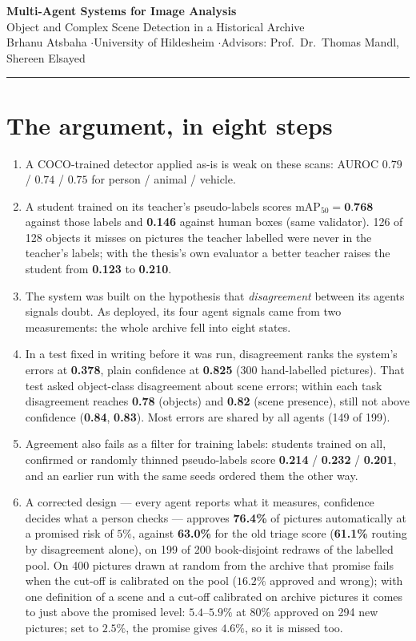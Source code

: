 \documentclass[10pt,a4paper]{article}
\newcommand{\num}[1]{\textbf{#1}}
\begin{document}
\begin{center}
{\Large\bfseries Multi-Agent Systems for Image Analysis}\\[1mm]
{\normalsize Object and Complex Scene Detection in a Historical Archive}\\[2mm]
{\footnotesize\color{PrismGray} Brhanu Atsbaha \quad$\cdot$\quad University of Hildesheim \quad$\cdot$\quad Advisors: Prof.\ Dr.\ Thomas Mandl, Shereen Elsayed}
\end{center}
\vspace{-2mm}
\rule{\textwidth}{0.8pt}

\section{The argument, in eight steps}
\begin{enumerate}[leftmargin=1.4em, itemsep=2pt, topsep=3pt]
  \item A COCO-trained detector applied as-is is weak on these scans: AUROC $0.79$ / $0.74$ / $0.75$ for person / animal / vehicle.
  \item A student trained on its teacher's pseudo-labels scores $\text{mAP}_{50}=\num{0.768}$ against those labels and \num{0.146} against human boxes (same validator). 126 of 128 objects it misses on pictures the teacher labelled were never in the teacher's labels; with the thesis's own evaluator a better teacher raises the student from \num{0.123} to \num{0.210}.
  \item The system was built on the hypothesis that \emph{disagreement} between its agents signals doubt. As deployed, its four agent signals came from two measurements: the whole archive fell into eight states.
  \item In a test fixed in writing before it was run, disagreement ranks the system's errors at \num{0.378}, plain confidence at \num{0.825} (300 hand-labelled pictures). That test asked object-class disagreement about scene errors; within each task disagreement reaches \num{0.78} (objects) and \num{0.82} (scene presence), still not above confidence (\num{0.84}, \num{0.83}). Most errors are shared by all agents (149 of 199).
  \item Agreement also fails as a filter for training labels: students trained on all, confirmed or randomly thinned pseudo-labels score \num{0.214} / \num{0.232} / \num{0.201}, and an earlier run with the same seeds ordered them the other way.
  \item A corrected design --- every agent reports what it measures, confidence decides what a person checks --- approves \num{76.4\%} of pictures automatically at a promised risk of $5\%$, against \num{63.0\%} for the old triage score (\num{61.1\%} routing by disagreement alone), on 199 of 200 book-disjoint redraws of the labelled pool. On 400 pictures drawn at random from the archive that promise fails when the cut-off is calibrated on the pool ($16.2\%$ approved and wrong); with one definition of a scene and a cut-off calibrated on archive pictures it comes to just above the promised level: $5.4$--$5.9\%$ at $80\%$ approved on 294 new pictures; set to $2.5\%$, the promise gives $4.6\%$, so it is missed too.

\end{enumerate}
\end{document}
